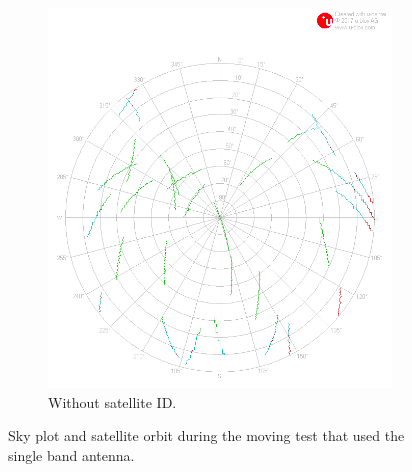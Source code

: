 \documentclass[letterpaper, 10 pt,onecolumn]{article}
\begin{document}
\begin{figure}[H]
\begin{subfigure}{.45\textwidth}
			\includegraphics[width=\linewidth]{../Moving_SingleBand/skyplot_orbit.png}
			\caption{	Without satellite ID.}
			\label{fig:mt1_obt}
		\end{subfigure}
		\caption[short]{Sky plot and satellite orbit during the moving test that used the single band antenna.}
		\label{fig:mt1}
	\end{figure}
\end{document}
